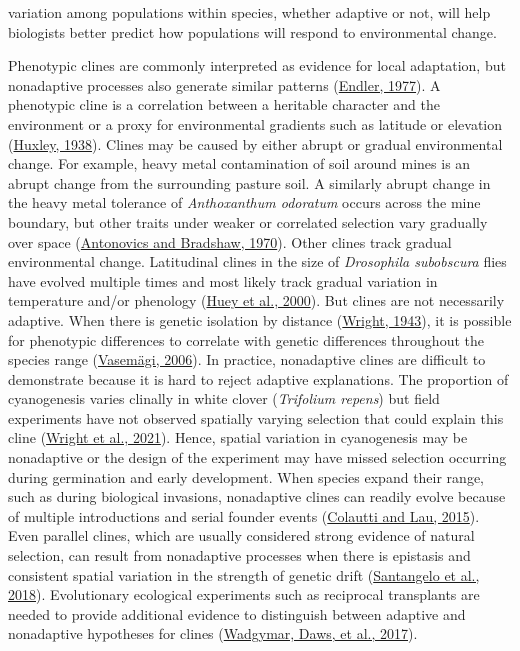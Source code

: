 \documentclass[
  12pt,
]{article}
\begin{document}
variation among populations within species, whether adaptive or not, will help biologists better predict how populations will respond to environmental change.

Phenotypic clines are commonly interpreted as evidence for local adaptation, but nonadaptive processes also generate similar patterns (\protect\hyperlink{ref-endler_geographic_1977}{Endler, 1977}). A phenotypic cline is a correlation between a heritable character and the environment or a proxy for environmental gradients such as latitude or elevation (\protect\hyperlink{ref-huxley_clines_1938}{Huxley, 1938}). Clines may be caused by either abrupt or gradual environmental change. For example, heavy metal contamination of soil around mines is an abrupt change from the surrounding pasture soil. A similarly abrupt change in the heavy metal tolerance of \emph{Anthoxanthum odoratum} occurs across the mine boundary, but other traits under weaker or correlated selection vary gradually over space (\protect\hyperlink{ref-antonovics_evolution_1970}{Antonovics and Bradshaw, 1970}). Other clines track gradual environmental change. Latitudinal clines in the size of \emph{Drosophila subobscura} flies have evolved multiple times and most likely track gradual variation in temperature and/or phenology (\protect\hyperlink{ref-huey_rapid_2000}{Huey et al., 2000}). But clines are not necessarily adaptive. When there is genetic isolation by distance (\protect\hyperlink{ref-wright_isolation_1943}{Wright, 1943}), it is possible for phenotypic differences to correlate with genetic differences throughout the species range (\protect\hyperlink{ref-vasemagi_adaptive_2006}{Vasemägi, 2006}). In practice, nonadaptive clines are difficult to demonstrate because it is hard to reject adaptive explanations. The proportion of cyanogenesis varies clinally in white clover (\emph{Trifolium repens}) but field experiments have not observed spatially varying selection that could explain this cline (\protect\hyperlink{ref-wright_genetic_2021}{Wright et al., 2021}). Hence, spatial variation in cyanogenesis may be nonadaptive or the design of the experiment may have missed selection occurring during germination and early development. When species expand their range, such as during biological invasions, nonadaptive clines can readily evolve because of multiple introductions and serial founder events (\protect\hyperlink{ref-colautti_contemporary_2015}{Colautti and Lau, 2015}). Even parallel clines, which are usually considered strong evidence of natural selection, can result from nonadaptive processes when there is epistasis and consistent spatial variation in the strength of genetic drift (\protect\hyperlink{ref-santangelo_modern_2018}{Santangelo et al., 2018}). Evolutionary ecological experiments such as reciprocal transplants are needed to provide additional evidence to distinguish between adaptive and nonadaptive hypotheses for clines (\protect\hyperlink{ref-wadgymar_integrating_2017}{Wadgymar, Daws, et al., 2017}).
\end{document}
